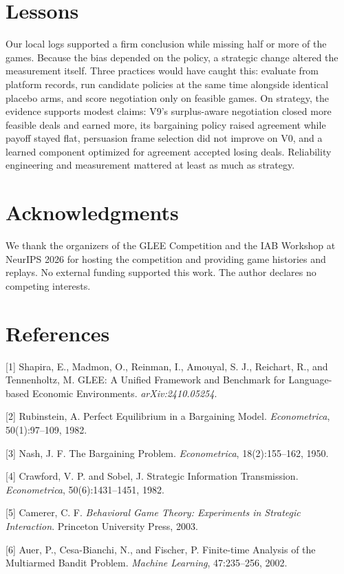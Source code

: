 \documentclass{article}
\begin{document}
\section{Lessons}

Our local logs supported a firm conclusion while missing half or more of the games. Because the bias depended on the policy, a strategic change altered the measurement itself. Three practices would have caught this: evaluate from platform records, run candidate policies at the same time alongside identical placebo arms, and score negotiation only on feasible games. On strategy, the evidence supports modest claims: V9's surplus-aware negotiation closed more feasible deals and earned more, its bargaining policy raised agreement while payoff stayed flat, persuasion frame selection did not improve on V0, and a learned component optimized for agreement accepted losing deals. Reliability engineering and measurement mattered at least as much as strategy.

\section*{Acknowledgments}
We thank the organizers of the GLEE Competition and the IAB Workshop at NeurIPS 2026 for hosting the competition and providing game histories and replays. No external funding supported this work. The author declares no competing interests.

\section*{References}
\small

[1] Shapira, E., Madmon, O., Reinman, I., Amouyal, S. J., Reichart, R., and Tennenholtz, M. GLEE: A Unified Framework and Benchmark for Language-based Economic Environments. \emph{arXiv:2410.05254}.

[2] Rubinstein, A. Perfect Equilibrium in a Bargaining Model. \emph{Econometrica}, 50(1):97--109, 1982.

[3] Nash, J. F. The Bargaining Problem. \emph{Econometrica}, 18(2):155--162, 1950.

[4] Crawford, V. P. and Sobel, J. Strategic Information Transmission. \emph{Econometrica}, 50(6):1431--1451, 1982.

[5] Camerer, C. F. \emph{Behavioral Game Theory: Experiments in Strategic Interaction}. Princeton University Press, 2003.

[6] Auer, P., Cesa-Bianchi, N., and Fischer, P. Finite-time Analysis of the Multiarmed Bandit Problem. \emph{Machine Learning}, 47:235--256, 2002.
\end{document}
